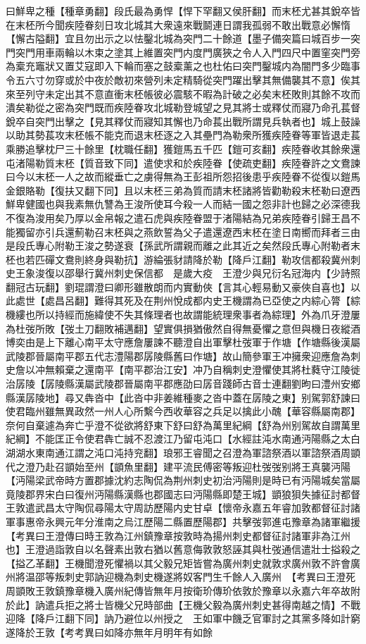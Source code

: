 曰鮮卑之種【種章勇翻】段氏最為勇悍【悍下罕翻又侯肝翻】而末柸尤甚其銳卒皆在末柸所今聞疾陸眷刻日攻北城其大衆遠來戰鬬連日謂我孤弱不敢出戰意必懈惰【懈古隘翻】宜且勿出示之以怯鑿北城為突門二十餘道【墨子備突篇曰城百步一突門突門用車兩輪以木束之塗其上維置突門内度門廣狹之令人入門四尺中置窐突門旁為槖充竈狀又置艾寇即入下輪而塞之鼓槖薰之也杜佑曰突門鑿城内為闇門多少臨事令五六寸勿穿或於中夜於敵初來營列未定精騎從突門躍出擊其無備襲其不意】俟其來至列守未定出其不意直衝末柸帳彼必震駭不暇為計破之必矣末柸敗則其餘不攻而潰矣勒從之密為突門既而疾陸眷攻北城勒登城望之見其將士或釋仗而寢乃命孔萇督銳卒自突門出擊之【見其釋仗而寢知其懈也乃命萇出戰所謂見兵執者也】城上鼓譟以助其勢萇攻末柸帳不能克而退末柸逐之入其壘門為勒衆所獲疾陸眷等軍皆退走萇乘勝追擊枕尸三十餘里【枕職任翻】獲鎧馬五千匹【鎧可亥翻】疾陸眷收其餘衆還屯渚陽勒質末柸【質音致下同】遣使求和於疾陸眷【使疏吏翻】疾陸眷許之文鴦諫曰今以末柸一人之故而縱垂亡之虜得無為王彭祖所怨招後患乎疾陸眷不從復以鎧馬金銀賂勒【復扶又翻下同】且以末柸三弟為質而請末柸諸將皆勸勒殺末柸勒曰遼西鮮卑健國也與我素無仇讐為王浚所使耳今殺一人而結一國之怨非計也歸之必深德我不復為浚用矣乃厚以金帛報之遣石虎與疾陸眷盟于渚陽結為兄弟疾陸眷引歸王昌不能獨留亦引兵還薊勒召末柸與之燕飲誓為父子遣還遼西末柸在塗日南嚮而拜者三由是段氏專心附勒王浚之勢遂衰【孫武所謂親而離之此其近之矣然段氏專心附勒者末柸也若匹磾文鴦則終身與勒抗】游綸張豺請降於勒【降戶江翻】勒攻信都殺冀州刺史王象浚復以邵舉行冀州刺史保信都　是歲大疫　王澄少與兄衍名冠海内【少詩照翻冠古玩翻】劉琨謂澄曰卿形雖散朗而内實動俠【言其心輕易動又豪俠自喜也】以此處世【處昌呂翻】難得其死及在荆州悅成都内史王機謂為已亞使之内綜心膂【綜機縷也所以持經而施緯使不失其條理者也故謂能統理衆事者為綜理】外為爪牙澄屢為杜弢所敗【弢土刀翻敗補邁翻】望實俱損猶傲然自得無憂懼之意但與機日夜縱酒博奕由是上下離心南平太守應詹屢諫不聽澄自出軍擊杜弢軍于作塘【作塘縣後漢屬武陵郡晉屬南平郡五代志澧陽郡孱陵縣舊曰作塘】故山簡參軍王冲擁衆迎應詹為刺史詹以冲無賴棄之還南平【南平郡治江安】冲乃自稱刺史澄懼使其將杜蕤守江陵徙治孱陵【孱陵縣漢屬武陵郡晉屬南平郡應劭曰孱音踐師古音士連翻劉昫曰澧州安鄉縣漢孱陵地】尋又犇沓中【此沓中非姜維種麥之沓中蓋在孱陵之東】别駕郭舒諫曰使君臨州雖無異政然一州人心所繫今西收華容之兵足以擒此小醜【華容縣屬南郡】奈何自棄遽為奔亡乎澄不從欲將舒東下舒曰舒為萬里紀綱【舒為州别駕故自謂萬里紀綱】不能匡正令使君犇亡誠不忍渡江乃留屯沌口【水經註沌水南通沔陽縣之太白湖湖水東南通江謂之沌口沌持兖翻】琅邪王睿聞之召澄為軍諮祭酒以軍諮祭酒周顗代之澄乃赴召顗始至州【顗魚里翻】建平流民傅密等叛迎杜弢弢别將王真襲沔陽【沔陽梁武帝時方置郡據沈約志陶侃為荆州刺史初治沔陽則是時已有沔陽城矣當屬竟陵郡界宋白曰復州沔陽縣漢縣也郡國志曰沔陽縣即楚王城】顗狼狽失據征討都督王敦遣武昌太守陶侃尋陽太守周訪歷陽内史甘卓【懷帝永嘉五年睿加敦都督征討諸軍事惠帝永興元年分淮南之烏江歷陽二縣置歷陽郡】共擊弢郭進屯豫章為諸軍繼援　【考異曰王澄傳曰時王敦為江州鎮豫章按敦時為揚州刺史都督征討諸軍非為江州也】王澄過詣敦自以名聲素出敦右猶以舊意侮敦敦怒誣其與杜弢通信遣壯士搤殺之【搤乙革翻】王機聞澄死懼禍以其父毅兄矩皆嘗為廣州刺史就敦求廣州敦不許會廣州將温邵等叛刺史郭訥迎機為刺史機遂將奴客門生千餘人入廣州　【考異曰王澄死周顗敗王敦鎮豫章機入廣州紀傳皆無年月按衛玠傳玠依敦於豫章以永嘉六年卒故附於此】訥遣兵拒之將士皆機父兄時部曲【王機父毅為廣州刺史甚得南越之情】不戰迎降【降戶江翻下同】訥乃避位以州授之　王如軍中饑乏官軍討之其黨多降如計窮遂降於王敦【考考異曰如降亦無年月明年有如餘